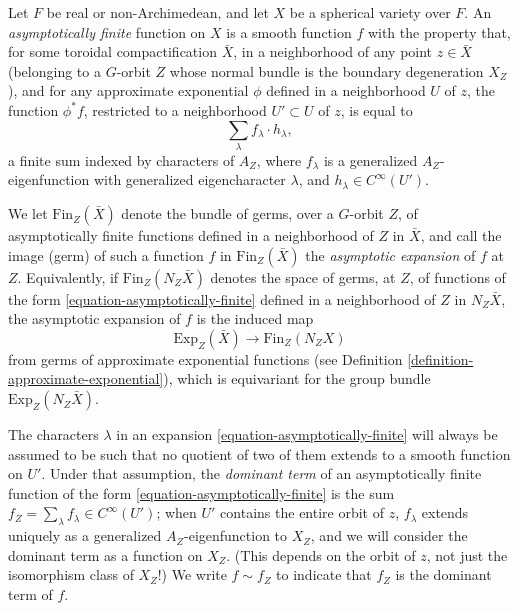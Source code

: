 \begin{definition}
 \label{definition-asymptotically-finite}
 Let $F$ be  real or non-Archimedean, and let $X$ be a spherical variety over $F$. An \emph{asymptotically finite} function on $X$ is a smooth function $f$ with the property that, for some toroidal compactification $\bar X$, in a neighborhood of any point $z\in \bar X$ (belonging to a $G$-orbit $Z$ whose normal bundle is the boundary degeneration $X_Z$), and for any approximate exponential $\phi$ defined in a neighborhood $U$ of $z$, the function $\phi^*f$, restricted to a neighborhood $U'\subset U$ of $z$, is equal to 
 \begin{equation}
  \label{equation-asymptotically-finite}
  \sum_\lambda f_\lambda \cdot h_\lambda,
 \end{equation}
 a finite sum indexed by characters of $A_Z$, where $f_\lambda$ is a generalized $A_Z$-eigenfunction with generalized eigencharacter $\lambda$, and $h_\lambda \in C^\infty(U')$.
  
 We let $\text{Fin}_Z(\bar X)$ denote the bundle of germs, over a $G$-orbit $Z$, of asymptotically finite functions defined in a neighborhood of $Z$ in $\bar X$, and call the image (germ) of such a function $f$ in $\text{Fin}_Z(\bar X)$ the {\it asymptotic expansion} of $f$ at $Z$. Equivalently, if $\text{Fin}_Z(N_Z\bar X)$ denotes the space of germs, at $Z$, of functions of the form \eqref{equation-asymptotically-finite} defined in a neighborhood of $Z$ in $N_Z \bar X$, the asymptotic expansion of $f$ is the induced map
 $$ \text{Exp}_Z(\bar X) \to \text{Fin}_Z (N_Z X)$$
 from germs of approximate exponential functions (see Definition \ref{definition-approximate-exponential}), which is equivariant for the group bundle $\text{Exp}_Z(N_Z\bar X)$. 
  
  The characters $\lambda$ in an expansion \eqref{equation-asymptotically-finite} will always be assumed to be such that no quotient of two of them extends to a smooth function on $U'$. 
 Under that assumption, the {\it dominant term} of an asymptotically finite function of the form \eqref{equation-asymptotically-finite} is the sum $f_Z=\sum_{\lambda} f_{\lambda} \in C^\infty(U')$; when $U'$ contains the entire orbit of $z$, $f_{\lambda}$ extends uniquely as a generalized $A_Z$-eigenfunction to $X_Z$, and we will consider the dominant term as a function on $X_Z$. (This depends on the orbit of $z$, not just the isomorphism class of $X_Z$!) We write $f\sim f_Z$ to indicate that $f_Z$ is the dominant term of $f$.
\end{definition}

